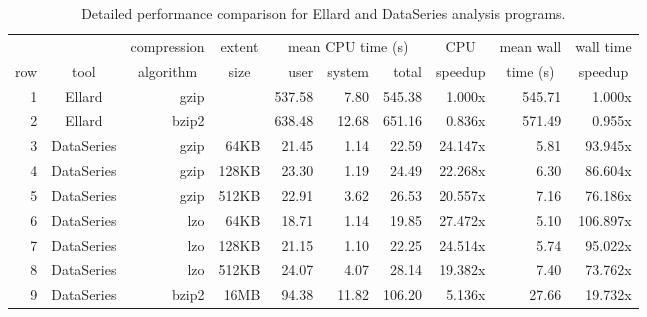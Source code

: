 \documentclass{acm_proc_article-sp}
\newcommand{\fix}[1]{{\LARGE\ensuremath{\bullet}}\textbf{#1}}
\begin{document}
\begin{table*}
\centering
\begin{tabular}{|r||c|r|r|r|r|r|r|r|r|} \hline
 &  & \multicolumn{1}{c|}{compression} & \multicolumn{1}{c|}{extent}  & \multicolumn{3}{c|}{mean CPU time (s)}     & \multicolumn{1}{c|}{CPU}     & \multicolumn{1}{c|}{mean wall}    & \multicolumn{1}{c|}{wall time} \\ \cline{4-6}
row & tool & \multicolumn{1}{c|}{algorithm} & \multicolumn{1}{c|}{size}  & user & system & total  & \multicolumn{1}{c|}{speedup} & \multicolumn{1}{c|}{time (s)} & \multicolumn{1}{c|}{speedup}  \\ \hline
1 &Ellard & gzip &  & 537.58    &  7.80     & 545.38   &  1.000x & 545.71   &   1.000x \\
2 & Ellard & bzip2 & & 638.48    & 12.68     & 651.16   &  0.836x & 571.49   &   0.955x \\
\hline
3 & DataSeries & gzip & 64KB   &  21.45    &  1.14     &  22.59   & 24.147x &   5.81   &  93.945x \\
4 & DataSeries & gzip & 128KB  &  23.30    &  1.19     &  24.49   & 22.268x &   6.30   &  86.604x \\
5 & DataSeries & gzip & 512KB  &  22.91    &  3.62     &  26.53   & 20.557x &   7.16   &  76.186x \\
\hline
6 & DataSeries & lzo & 64KB  &  18.71    &  1.14     &  19.85   & 27.472x &   5.10   & 106.897x \\
7 & DataSeries & lzo &128KB &  21.15    &  1.10     &  22.25   & 24.514x &   5.74   &  95.022x \\
8 & DataSeries & lzo &512KB &  24.07    &  4.07     &  28.14   & 19.382x &   7.40   &  73.762x \\ \hline
9 & DataSeries & bzip2 &16MB  &  94.38    & 11.82     & 106.20   &  5.136x &  27.66   &  19.732x \\
\hline
\end{tabular}

\caption{
Detailed performance comparison for Ellard and DataSeries analysis programs.}


\label{tab:summary}
\end{table*}



\end{document}
